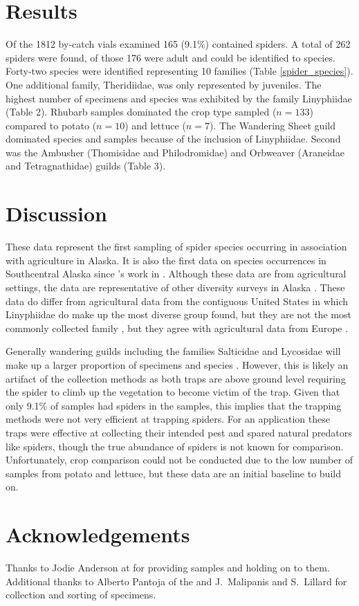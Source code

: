 \section{Results}
Of the 1812 by-catch vials examined 165 (9.1\%) contained spiders. A total of 262 spiders were found, of those 176 were adult and could be identified to species. Forty-two species were identified representing 10 families (Table \ref{spider_species}). One additional family, Theridiidae, was only represented by juveniles. The highest number of specimens and species was exhibited by the family Linyphiidae (Table 2). Rhubarb samples dominated the crop type sampled ($n=133$) compared to potato ($n=10$) and lettuce ($n=7$). The Wandering Sheet guild dominated species and samples because of the inclusion of Linyphiidae. Second was the Ambusher (Thomisidae and Philodromidae) and Orbweaver (Araneidae and Tetragnathidae) guilds (Table 3). 



\section{Discussion}

These data represent the first sampling of spider species occurring in association with agriculture in Alaska. It is also the first data on species occurrences in Southcentral Alaska since \citeauthor{ChamberlinIvie1947}’s work in \citeyear{ChamberlinIvie1947}. Although these data are from agricultural settings, the data are representative of other diversity surveys in Alaska \citep{Slowik2006, SlowikBlagoev2012, Sikesetal2013}.  These data do differ from agricultural data from the contiguous United States in which Linyphiidae do make up the most diverse group found, but they are not the most commonly collected family \citep{YoungEdwards1990}, but they agree with agricultural data from Europe \citep{NyffelerBirkhofer2017}. 

Generally wandering guilds including the families Salticidae and Lycosidae will make up a larger proportion of specimens and species \citep{YoungEdwards1990, Kerzicniketal2013}. However, this is likely an artifact of the collection methods as both traps are above ground level requiring the spider to climb up the vegetation to become victim of the trap. Given that only 9.1\% of samples had spiders in the samples, this implies that the trapping methods were not very efficient at trapping spiders. For an  application these traps were effective at collecting their intended pest and spared natural predators like spiders, though the true abundance of spiders is not known for comparison. Unfortunately, crop comparison could not be conducted due to the low number of samples from potato and lettuce, but these data are an initial baseline to build on. 

\section{Acknowledgements}

Thanks to Jodie Anderson at  for providing samples and holding on to them. Additional thanks to Alberto Pantoja of the  and J.\ Malipanis and S.\ Lillard for collection and sorting of specimens. 


